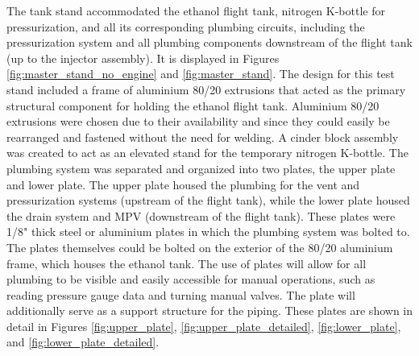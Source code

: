 \documentclass[9pt]{article} %
\numberwithin{equation}{section} %
\begin{document}
\hspace{\parindent} The tank stand accommodated the ethanol flight tank, nitrogen K-bottle for pressurization, and all its corresponding plumbing circuits, including the pressurization system and all plumbing components downstream of the flight tank (up to the injector assembly). It is displayed in Figures \ref{fig:master_stand_no_engine} and \ref{fig:master_stand}. The design for this test stand included a frame of aluminium 80/20 extrusions that acted as the primary structural component for holding the ethanol flight tank. Aluminium 80/20 extrusions were chosen due to their availability and since they could easily be rearranged and fastened without the need for welding. A cinder block assembly was created to act as an elevated stand for the temporary nitrogen K-bottle. The plumbing system was separated and organized into two plates, the upper plate and lower plate. The upper plate housed the plumbing for the vent and pressurization systems (upstream of the flight tank), while the lower plate housed the drain system and MPV (downstream of the flight tank). These plates were 1/8" thick steel or aluminium plates in which the plumbing system was bolted to. The plates themselves could be bolted on the exterior of the 80/20 aluminium frame, which houses the ethanol tank. The use of plates will allow for all plumbing to be visible and easily accessible for manual operations, such as reading pressure gauge data and turning manual valves. The plate will additionally serve as a support structure for the piping. These plates are shown in detail in Figures \ref{fig:upper_plate}, \ref{fig:upper_plate_detailed}, \ref{fig:lower_plate}, and \ref{fig:lower_plate_detailed}.
\end{document}
